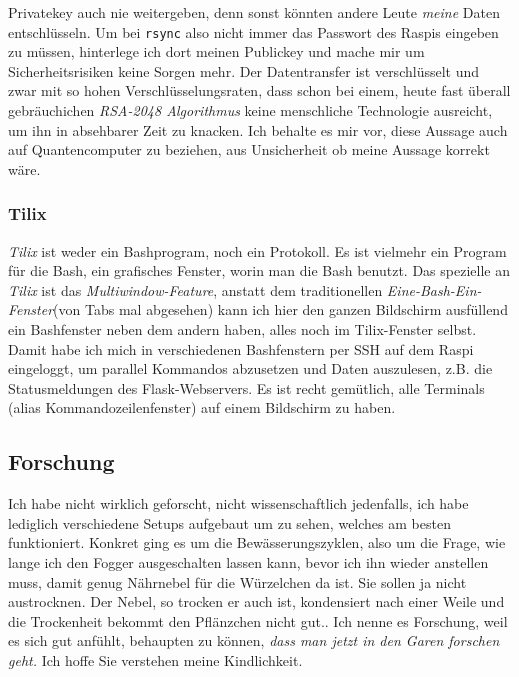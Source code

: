 \documentclass[12pt,titlepage,a4paper]{article}
\begin{document}
Privatekey auch nie weitergeben, denn sonst könnten andere Leute \textit{meine} Daten entschlüsseln. Um bei \verb/rsync/ also nicht immer das Passwort des Raspis eingeben zu müssen, hinterlege ich dort meinen Publickey und mache mir um Sicherheitsrisiken keine Sorgen mehr. Der Datentransfer ist verschlüsselt und zwar mit so hohen Verschlüsselungsraten, dass schon bei einem, heute fast überall gebräuchichen \textit{RSA-2048 Algorithmus} keine menschliche Technologie ausreicht, um ihn in absehbarer Zeit zu knacken. Ich behalte es mir vor, diese Aussage auch auf Quantencomputer zu beziehen, aus Unsicherheit ob meine Aussage korrekt wäre.

\subsubsection{Tilix}
\textit{Tilix} ist weder ein Bashprogram, noch ein Protokoll. Es ist vielmehr ein Program für die Bash, ein grafisches Fenster, worin man die Bash benutzt. Das spezielle an \textit{Tilix} ist das \textit{Multiwindow-Feature}, anstatt dem traditionellen \textit{Eine-Bash-Ein-Fenster}(von Tabs mal abgesehen) kann ich hier den ganzen Bildschirm ausfüllend ein Bashfenster neben dem andern haben, alles noch im Tilix-Fenster selbst. Damit habe ich mich in verschiedenen Bashfenstern per SSH auf dem Raspi eingeloggt, um parallel Kommandos abzusetzen und Daten auszulesen, z.B. die Statusmeldungen des Flask-Webservers. Es ist recht gemütlich, alle Terminals (alias Kommandozeilenfenster) auf einem Bildschirm zu haben.

\subsection{Forschung}
Ich habe nicht wirklich geforscht, nicht wissenschaftlich jedenfalls, ich habe lediglich verschiedene Setups aufgebaut um zu sehen, welches am besten funktioniert. Konkret ging es um die Bewässerungszyklen, also um die Frage, wie lange ich den Fogger ausgeschalten lassen kann, bevor ich ihn wieder anstellen muss, damit genug Nährnebel für die Würzelchen da ist. Sie sollen ja nicht austrocknen. Der Nebel, so trocken er auch ist, kondensiert nach einer Weile und die Trockenheit bekommt den Pflänzchen nicht gut.. Ich nenne es Forschung, weil es sich gut anfühlt, behaupten zu können, \textit{dass man jetzt in den Garen forschen geht.} Ich hoffe Sie verstehen meine Kindlichkeit.
\end{document}
